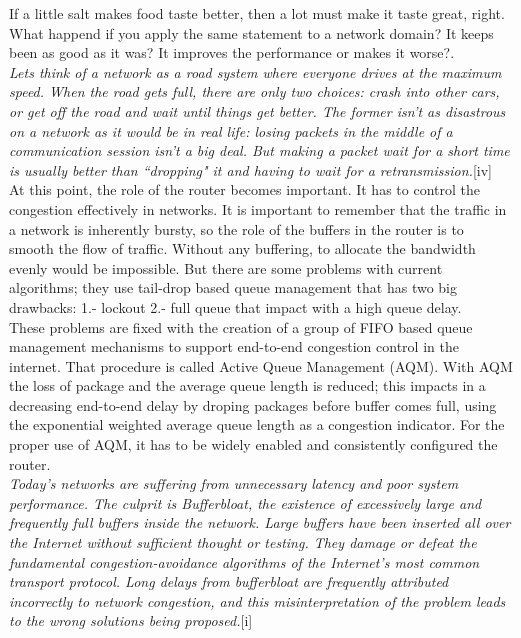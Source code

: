 If a little salt makes food taste better, then a lot must make it taste great, right. What happend if you apply the same statement to a network domain? It keeps been as good as it was? It improves the performance or makes it worse?.\\

\textit{Lets think of a network as a road system where everyone drives at the maximum speed. When the road gets full, there are only two choices: crash into other cars, or get off the road and wait until things get better. The former isn't as disastrous on a network as it would be in real life: losing packets in the middle of a communication session isn't a big deal. But making a packet wait for a short time is usually better than ``dropping" it and having to wait for a retransmission.}[iv]\\

At this point, the role of the router becomes important. It has to control the congestion effectively in networks. It is important to remember that the traffic in a network is inherently bursty, so the role of the buffers in the router is to smooth the flow of traffic. Without any buffering, to allocate the bandwidth evenly would be impossible. But there are some problems with current algorithms; they use tail-drop based queue management that has two big drawbacks: 1.- lockout 2.- full queue that impact with a high queue delay.\\

These problems are fixed with the creation of a group of FIFO based queue management mechanisms to support end-to-end congestion control in the internet. That procedure is called Active Queue Management (AQM). With AQM the loss of package and the average queue length is reduced; this impacts in a decreasing end-to-end delay by droping packages before buffer comes full, using the exponential weighted average queue length as a congestion indicator. For the proper use of AQM, it has to be widely enabled and consistently configured the router.\\

\textit{Today's networks are suffering from unnecessary latency and poor system performance. The culprit is Bufferbloat, the existence of excessively large and frequently full buffers inside the network. Large buffers have been inserted all over the Internet without sufficient thought or testing. They damage or defeat the fundamental congestion-avoidance algorithms of the Internet's most common transport protocol. Long delays from bufferbloat are frequently attributed incorrectly to network congestion, and this misinterpretation of the problem leads to the wrong solutions being proposed.}[i]\\

